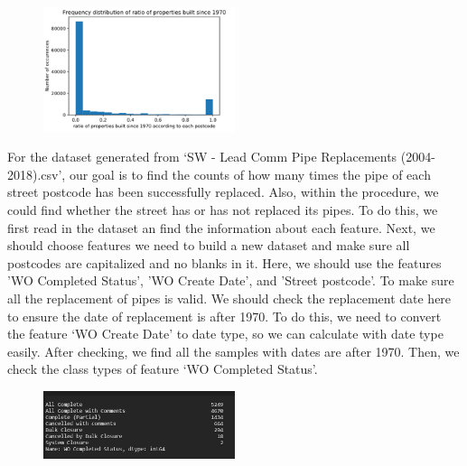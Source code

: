 \documentclass[11pt,twoside]{article}
\numberwithin{Theorem}{section}
\numberwithin{Definition}{section}
\numberwithin{Lemma}{section}
\numberwithin{Algorithm}{section}
\numberwithin{equation}{section}
\begin{document}
\begin{figure}[!ht]
    \centering
    \includegraphics[width=0.5\textwidth]{p9.png}
    \end{figure}

For the dataset generated from ‘SW - Lead Comm Pipe Replacements (2004-2018).csv’, our goal is to find the counts of how many times the pipe of each street postcode has been successfully replaced. Also, within the procedure, we could find whether the street has or has not replaced its pipes. To do this, we first read in the dataset an find the information about each feature. Next, we should choose features we need to build a new dataset and make sure all postcodes are capitalized and no blanks in it. Here, we should use the features 'WO Completed Status', 'WO Create Date', and 'Street postcode'. To make sure all the replacement of pipes is valid. We should check the replacement date here to ensure the date of replacement is after 1970. To do this, we need to convert the feature ‘WO Create Date’ to date type, so we can calculate with date type easily. After checking, we find all the samples with dates are after 1970. Then, we check the class types of feature ‘WO Completed Status’.

\begin{figure}[!ht]
    \centering
    \includegraphics[width=0.5\textwidth]{p10.png}
    \end{figure}
\end{document}
